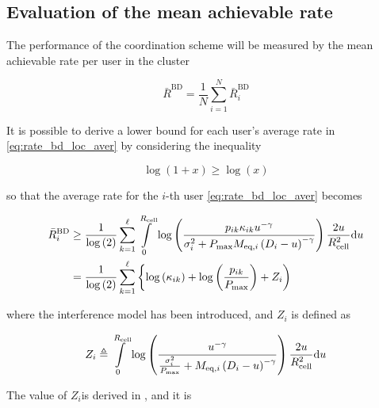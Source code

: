 \subsection{Evaluation of the mean achievable rate}\label{ssec:achiev_rate_eval}

The performance of the coordination scheme will be measured by the mean
achievable rate per user in the cluster

\begin{equation} \label{eq:mean_achiev_rate_def}
    \bar{R}^{\text{BD}} = \frac{1}{N} \sum\limits_{i = 1}^N
    \bar{R}_i^{\text{BD}}  
\end{equation}

It is possible to derive a lower bound for each user's average rate in
\eqref{eq:rate_bd_loc_aver} by considering the inequality

\begin{equation} \label{eq:log_ineq}
    \log\left(1+x\right) \geq \log\left(x\right)
\end{equation}

\noindent
so that the average rate for the $i$-th user \eqref{eq:rate_bd_loc_aver} becomes

\begin{equation} \label{rate_bd_i_logapprox}
    \begin{aligned}
    \bar{R}_i^{\text{BD}} &\geq \frac{1}{\log\left(2\right)} \sum\limits_{k = 1}
    ^{\ell} \int\limits_0^{R_{\text{cell}}} \log\left(\frac{p_{ik}\kappa_{ik}u^{-\gamma}}
    {\sigma_i^2 + P_{\max}M_{\text{eq},i}\left(D_i - u\right)^{-\gamma}}\right)\frac{2u}
        {R_{\text{cell}}^2}\text{d} u \\
        &=\frac{1}{\log\left(2\right)}\sum\limits_{k=1}^{\ell}\left\{\log\left(
    \kappa_{ik}\right) + \log\left(\frac{p_{ik}}{P_{\max}}\right) + Z_i
    \right)
    \end{aligned}
\end{equation}

\noindent
where the interference model has been introduced, and $Z_i$ is defined as

\begin{equation} \label{eq:zi_def}
    Z_i \triangleq \int\limits_0^{R_{\text{cell}}}\log\left(\frac{u^{-\gamma}}
        {\frac{\sigma_i^2}{P_{\max}} + M_{\text{eq},i}\left(D_i - u\right)^{-\gamma}}
    \right)\frac{2u}{R_{\text{cell}}^2} \text{d} u
\end{equation}

The value of $Z_i$is derived in , and it is

